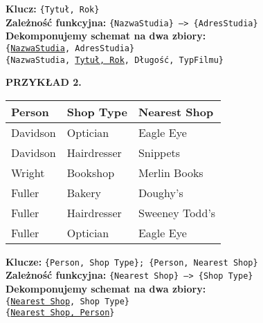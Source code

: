 \documentclass[a5paper,6pt]{article}
\begin{document}
    \vskip 0.5cm

    \textbf{Klucz:} \texttt{\{Tytuł, Rok\}}\\
    \textbf{Zależność funkcyjna:} \texttt{\{NazwaStudia\} --> \{AdresStudia\}}\\

    \textbf{Dekomponujemy schemat na dwa zbiory:}\\
    \texttt{\{\underline{NazwaStudia}, AdresStudia\}}\\
    \texttt{\{NazwaStudia, \underline{Tytuł, Rok}, Długość, TypFilmu\}}\\

    \vskip 0.5cm

    \textbf{PRZYKŁAD 2.}

    \vskip 0.5cm

    \begin{center}
    \begin{tabular}{|l|l|l|}
        \hline
        \textbf{Person} &
        \textbf{Shop Type} &
        \textbf{Nearest Shop}\\
        \hline
        Davidson & Optician & Eagle Eye \\
        \hline
        Davidson & Hairdresser & Snippets \\
        \hline
        Wright & Bookshop & Merlin Books \\
        \hline
        Fuller & Bakery & Doughy's \\
        \hline
        Fuller & Hairdresser & Sweeney Todd's \\
        \hline
        Fuller & Optician & Eagle Eye \\
        \hline
        \end{tabular}
    \end{center}

    \vskip 0.5cm

    \textbf{Klucze:} \texttt{\{Person, Shop Type\}; \{Person, Nearest Shop\}}\\
    \textbf{Zależność funkcyjna:} \texttt{\{Nearest Shop\} --> \{Shop Type\}}\\

    \textbf{Dekomponujemy schemat na dwa zbiory:}\\
    \texttt{\{\underline{Nearest Shop}, Shop Type\}}\\
    \texttt{\{\underline{Nearest Shop, Person}\}}\\
\end{document}
